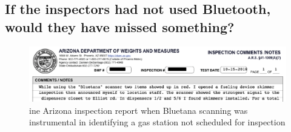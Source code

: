 \subsection {If the inspectors had not used Bluetooth, would they have missed something?}


\begin{figure}
\centering
\includegraphics[width=1\linewidth]{fig/arizona_report.pdf}
\caption{ine
\label{fig:hitlist_devices}
Arizona inspection report when Bluetana scanning was instrumental in identifying a gas station not scheduled for inspection
}
\end{figure}

\begin{table}[]
\centering


\caption{Comparison of our detection methodology vs existing tools for skimmers.}
\label{tab:capabilities}
\end{table}






